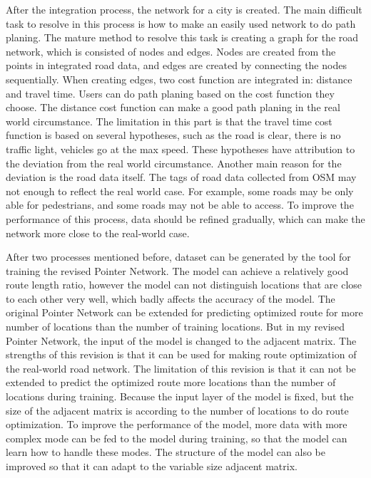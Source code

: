 \documentclass[final-report]{report-template}
\begin{document}
After the integration process, the network for a city is created.
The main difficult task to resolve in this process is how to make an easily used network to do path planing.
The mature method to resolve this task is creating a graph for the road network, which is consisted of nodes and edges.
Nodes are created from the points in integrated road data, and edges are created by connecting the nodes sequentially.
When creating edges, two cost function are integrated in: distance and travel time. 
Users can do path planing based on the cost function they choose. 
The distance cost function can make a good path planing in the real world circumstance.
The limitation in this part is that the travel time cost function is based on several hypotheses, 
such as the road is clear, there is no traffic light, vehicles go at the max speed. 
These hypotheses have attribution to the deviation from the real world circumstance. 
Another main reason for the deviation is the road data itself. 
The tags of road data collected from OSM may not enough to reflect the real world case.
For example, some roads may be only able for pedestrians, and some roads may not be able to access.
To improve the performance of this process, data should be refined gradually, which can make the network more close to the real-world case.

After two processes mentioned before, dataset can be generated by the tool for training the revised Pointer Network.
The model can achieve a relatively good route length ratio, 
however the model can not distinguish locations that are close to each other very well, which badly affects the accuracy of the model.
The original Pointer Network can be extended for predicting optimized route for more number of locations than the number of training locations.
But in my revised Pointer Network, the input of the model is changed to the adjacent matrix. 
The strengths of this revision is that it can be used for making route optimization of the real-world road network.
The limitation of this revision is that it can not be extended to predict the optimized route more locations than the number of locations during training.
Because the input layer of the model is fixed, but the size of the adjacent matrix is according to the number of locations to do route optimization.
To improve the performance of the model, 
more data with more complex mode can be fed to the model during training, so that the model can learn how to handle these modes.
The structure of the model can also be improved so that it can adapt to the variable size adjacent matrix.


\end{document}
